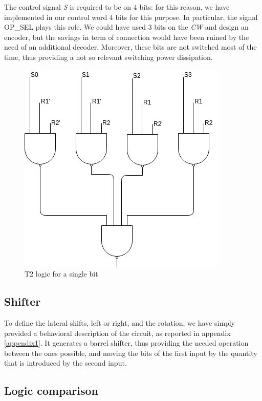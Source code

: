 The control signal \textit{S} is required to be on 4 bits: for this reason, we have implemented in our control word 4 bits for this purpose. In particular, the signal \textsf{OP\_SEL} plays this role. We could have used 3 bits on the \textit{CW} and design an encoder, but the savings in term of connection would have been ruined by the need of an additional decoder. Moreover, these bits are not switched most of the time, thus providing a not so relevant switching power dissipation.

\begin{figure}
	\centering
	\includegraphics[scale=0.6]{chapters/figures/logicT2}
	\caption{T2 logic for a single bit}
	\label{logic_fig}
\end{figure}

\subsection{Shifter}

To define the lateral shifts, left or right, and the rotation, we have simply provided a behavioral description of the circuit, as reported in appendix \ref{appendix1}. It generates a barrel shifter, thus providing the needed operation between the ones possible, and moving the bits of the first input by the quantity that is introduced by the second input.

\subsection{Logic comparison}

